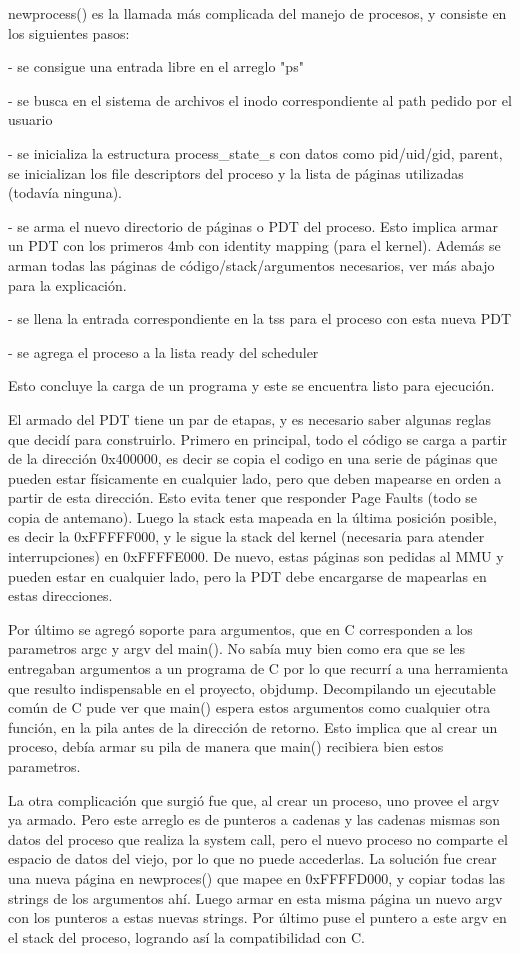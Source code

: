 newprocess() es la llamada más complicada del manejo de procesos, y consiste en
los siguientes pasos:

- se consigue una entrada libre en el arreglo "ps"

- se busca en el sistema de archivos el inodo correspondiente al path pedido
por el usuario

- se inicializa la estructura process\_state\_s con datos como pid/uid/gid,
parent, se inicializan los file descriptors del proceso y la lista de páginas
utilizadas (todavía ninguna).

- se arma el nuevo directorio de páginas o PDT del proceso. Esto implica armar
un PDT con los primeros 4mb con identity mapping (para el kernel). Además se
arman todas las páginas de código/stack/argumentos necesarios, ver más abajo
para la explicación.

- se llena la entrada correspondiente en la tss para el proceso con esta nueva
PDT

- se agrega el proceso a la lista ready del scheduler

Esto concluye la carga de un programa y este se encuentra listo para ejecución.

El armado del PDT tiene un par de etapas, y es necesario saber algunas reglas
que decidí para construirlo. Primero en principal, todo el código se carga a
partir de la dirección 0x400000, es decir se copia el codigo en una serie de
páginas que pueden estar físicamente en cualquier lado, pero que deben mapearse
en orden a partir de esta dirección. Esto evita tener que responder Page Faults
(todo se copia de antemano). Luego la stack esta mapeada en la última posición
posible, es decir la 0xFFFFF000, y le sigue la stack del kernel (necesaria para
atender interrupciones) en 0xFFFFE000. De nuevo, estas páginas son pedidas al
MMU y pueden estar en cualquier lado, pero la PDT debe encargarse de mapearlas
en estas direcciones.

Por último se agregó soporte para argumentos, que en C corresponden a los
parametros argc y argv del main(). No sabía muy bien como era que se les
entregaban argumentos a un programa de C por lo que recurrí a una
herramienta que resulto indispensable en el proyecto, objdump. Decompilando un
ejecutable común de C pude ver que main() espera estos argumentos como cualquier
otra función, en la pila antes de la dirección de retorno. Esto implica que al
crear un proceso, debía armar su pila de manera que main() recibiera bien estos
parametros.

La otra complicación que surgió fue que, al crear un proceso, uno provee el
argv ya armado. Pero este arreglo es de punteros a cadenas y las cadenas mismas
son datos del proceso que realiza la system call, pero el nuevo proceso no
comparte el espacio de datos del viejo, por lo que no puede accederlas. La
solución fue crear una nueva página en newproces() que mapee en 0xFFFFD000, y
copiar todas las strings de los argumentos ahí. Luego armar en esta misma
página un nuevo argv con los punteros a estas nuevas strings. Por último puse
el puntero a este argv en el stack del proceso, logrando así la compatibilidad
con C.

